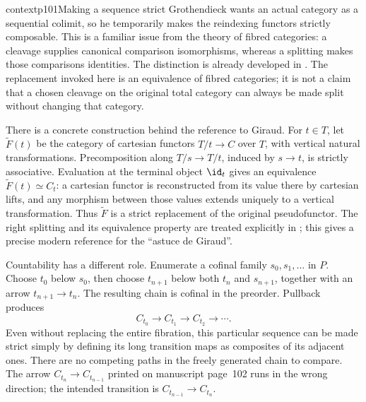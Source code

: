 \begin{dcomment}{context}{p101}{Making a sequence strict}
Grothendieck wants an actual category as a sequential colimit, so he temporarily makes the reindexing functors strictly composable. This is a familiar issue from the theory of fibred categories: a cleavage supplies canonical comparison isomorphisms, whereas a splitting makes those comparisons identities. The distinction is already developed in \citet[Expos\'e~VI, \S\S8--9]{SGA1}. The replacement invoked here is an equivalence of fibred categories; it is not a claim that a chosen cleavage on the original total category can always be made split without changing that category.

There is a concrete construction behind the reference to Giraud. For $t\in T$, let $\widetilde F(t)$ be the category of cartesian functors $T/t\to C$ over $T$, with vertical natural transformations. Precomposition along $T/s\to T/t$, induced by $s\to t$, is strictly associative. Evaluation at the terminal object $\id_t$ gives an equivalence $\widetilde F(t)\simeq C_t$: a cartesian functor is reconstructed from its value there by cartesian lifts, and any morphism between those values extends uniquely to a vertical transformation. Thus $\widetilde F$ is a strict replacement of the original pseudofunctor. The right splitting and its equivalence property are treated explicitly in \citet[Theorem~5.4 and Remark~5.5]{EmmeneggerMesitiRosoliniStreicher2024}; this gives a precise modern reference for the ``astuce de Giraud''.

Countability has a different role. Enumerate a cofinal family $s_0,s_1,\ldots$ in $P$. Choose $t_0$ below $s_0$, then choose $t_{n+1}$ below both $t_n$ and $s_{n+1}$, together with an arrow $t_{n+1}\to t_n$. The resulting chain is cofinal in the preorder. Pullback produces
\[
 C_{t_0}\longrightarrow C_{t_1}\longrightarrow C_{t_2}\longrightarrow\cdots.
\]
Even without replacing the entire fibration, this particular sequence can be made strict simply by defining its long transition maps as composites of its adjacent ones. There are no competing paths in the freely generated chain to compare. The arrow $C_{t_n}\to C_{t_{n-1}}$ printed on manuscript page~102 runs in the wrong direction; the intended transition is $C_{t_{n-1}}\to C_{t_n}$.
\end{dcomment}

